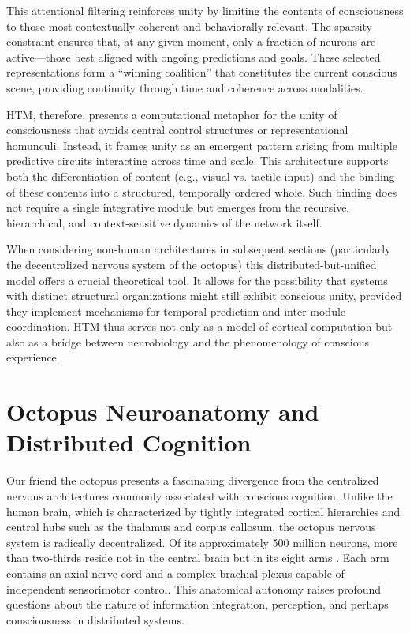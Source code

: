 \documentclass{article}
\begin{document}
This attentional filtering reinforces unity by limiting the contents of consciousness to those most contextually coherent and behaviorally relevant. The sparsity constraint ensures that, at any given moment, only a fraction of neurons are active—those best aligned with ongoing predictions and goals. These selected representations form a “winning coalition” that constitutes the current conscious scene, providing continuity through time and coherence across modalities.

HTM, therefore, presents a computational metaphor for the unity of consciousness that avoids central control structures or representational homunculi. Instead, it frames unity as an emergent pattern arising from multiple predictive circuits interacting across time and scale. This architecture supports both the differentiation of content (e.g., visual vs. tactile input) and the binding of these contents into a structured, temporally ordered whole. Such binding does not require a single integrative module but emerges from the recursive, hierarchical, and context-sensitive dynamics of the network itself.

When considering non-human architectures in subsequent sections (particularly the decentralized nervous system of the octopus) this distributed-but-unified model offers a crucial theoretical tool. It allows for the possibility that systems with distinct structural organizations might still exhibit conscious unity, provided they implement mechanisms for temporal prediction and inter-module coordination. HTM thus serves not only as a model of cortical computation but also as a bridge between neurobiology and the phenomenology of conscious experience.

\section{Octopus Neuroanatomy and Distributed Cognition}

Our friend the octopus presents a fascinating divergence from the centralized nervous architectures commonly associated with conscious cognition. Unlike the human brain, which is characterized by tightly integrated cortical hierarchies and central hubs such as the thalamus and corpus callosum, the octopus nervous system is radically decentralized. Of its approximately 500 million neurons, more than two-thirds reside not in the central brain but in its eight arms \parencite{huffard2013cephalopod}. Each arm contains an axial nerve cord and a complex brachial plexus capable of independent sensorimotor control. This anatomical autonomy raises profound questions about the nature of information integration, perception, and perhaps consciousness in distributed systems.
\end{document}
